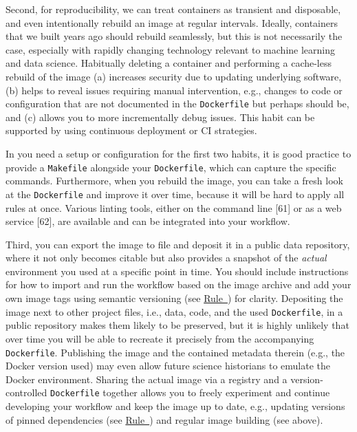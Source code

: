 \documentclass[10pt,letterpaper]{article}
\begin{document}
Second, for reproducibility, we can treat containers as transient and
disposable, and even intentionally rebuild an image at regular
intervals. Ideally, containers that we built years ago should rebuild
seamlessly, but this is not necessarily the case, especially with
rapidly changing technology relevant to machine learning and data
science. Habitually deleting a container and performing a cache-less
rebuild of the image (a) increases security due to updating underlying
software, (b) helps to reveal issues requiring manual intervention,
e.g., changes to code or configuration that are not documented in the
\texttt{Dockerfile} but perhaps should be, and (c) allows you to more
incrementally debug issues. This habit can be supported by using
continuous deployment or CI strategies.

In you need a setup or configuration for the first two habits, it is
good practice to provide a \texttt{Makefile} alongside your
\texttt{Dockerfile}, which can capture the specific commands.
Furthermore, when you rebuild the image, you can take a fresh look at
the \texttt{Dockerfile} and improve it over time, because it will be
hard to apply all rules at once. Various linting tools, either on the
command line {[}61{]} or as a web service {[}62{]}, are available and
can be integrated into your workflow.

Third, you can export the image to file and deposit it in a public data
repository, where it not only becomes citable but also provides a
snapshot of the \emph{actual} environment you used at a specific point
in time. You should include instructions for how to import and run the
workflow based on the image archive and add your own image tags using
semantic versioning (see
\hyperref[{rule:base}]{Rule~}) for clarity.
Depositing the image next to other project files, i.e., data, code, and
the used \texttt{Dockerfile}, in a public repository makes them likely
to be preserved, but it is highly unlikely that over time you will be
able to recreate it precisely from the accompanying \texttt{Dockerfile}.
Publishing the image and the contained metadata therein (e.g., the
Docker version used) may even allow future science historians to emulate
the Docker environment. Sharing the actual image via a registry and a
version-controlled \texttt{Dockerfile} together allows you to freely
experiment and continue developing your workflow and keep the image up
to date, e.g., updating versions of pinned dependencies (see
\hyperref[{rule:pinning}]{Rule~}) and regular
image building (see above).
\end{document}

